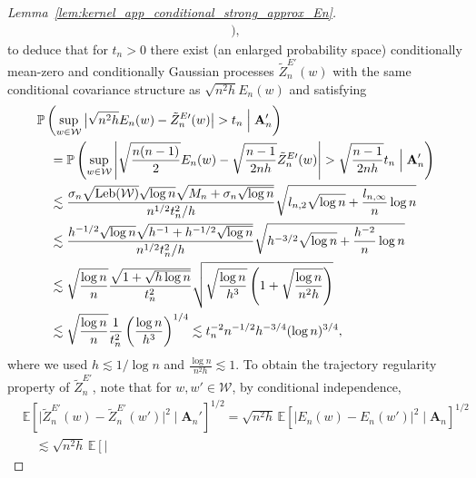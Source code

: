 \documentclass[11pt,lof]{puthesis}
\renewcommand{\P}{\ensuremath{\mathbb{P}}}
\newcommand{\E}{\ensuremath{\mathbb{E}}}
\newcommand{\bA}{\ensuremath{\mathbf{A}}}
\newcommand{\cW}{\ensuremath{\mathcal{W}}}
\DeclareMathOperator{\Leb}{Leb}
\theoremstyle{break}
\theoremstyle{proof}
\newtheorem{proof}{Proof}
\begin{document}
\begin{proof}[Lemma~\ref{lem:kernel_app_conditional_strong_approx_En}]
\begin{align*}
    \Big),
  \end{align*}
  to deduce that for $t_n > 0$ there exist
  (an enlarged probability space)
  conditionally mean-zero
  and conditionally Gaussian processes
  $\tilde Z_n^{E\prime}(w)$
  with the same conditional covariance structure as
  $\sqrt{n^2 h} E_n(w)$ and
  satisfying
  \begin{align*}
    &\P\left(
      \sup_{w \in \cW}
      \big|
      \sqrt{n^2h} E_n(w) - \tilde Z_n^{E\prime}(w)
      \big|
      > t_n
      \Bigm\vert \bA_n'
    \right) \\
    &\quad=
    \P\left(
      \sup_{w \in \cW}
      \left|
        \sqrt{\frac{n(n-1)}{2}} E_n(w)
        - \sqrt{\frac{n-1}{2 n h}} \tilde Z_n^{E\prime}(w)
      \right|
      > \sqrt{\frac{n-1}{2 n h}}
      t_n
      \Bigm\vert \bA_n'
    \right) \\
    &\quad\lesssim
    \frac{
      \sigma_n
      \sqrt{\Leb(\cW)}
      \sqrt{\log n}
      \sqrt{M_n + \sigma_n\sqrt{\log n}}
    }{n^{1/2} t_n^2 / h}
    \sqrt{
      l_{n,2}
      \sqrt{\log n}
      + \frac{l_{n,\infty}}{n}
    \log n} \\
    &\quad\lesssim
    \frac{
      h^{-1/2}
      \sqrt{\log n}
      \sqrt{h^{-1} + h^{-1/2} \sqrt{\log n}}
    }{n^{1/2} t_n^2 / h}
    \sqrt{
      h^{-3/2}
      \sqrt{\log n}
      + \frac{h^{-2}}{n}
    \log n} \\
    &\quad\lesssim
    \sqrt{\frac{\log n}{n}}
    \frac{
      \sqrt{1 + \sqrt{h \log n}}
    }{t_n^2}
    \sqrt{
      \sqrt{\frac{\log n}{h^3}}
      \left( 1 + \sqrt{\frac{\log n}{n^2 h}} \right)
    } \\
    &\quad\lesssim
    \sqrt{\frac{\log n}{n}}
    \frac{ 1 }{t_n^2}
    \left(
      \frac{\log n}{h^3}
    \right)^{1/4}
    \lesssim
    t_n^{-2}
    n^{-1/2}
    h^{-3/4}
    (\log n)^{3/4},
  \end{align*}
  where we used
  $h \lesssim 1 / \log n$
  and $\frac{\log n}{n^2 h} \lesssim 1$.
  To obtain the trajectory regularity property of
  $\tilde Z_n^{E\prime}$,
  note that
  for $w, w' \in \cW$,
  by conditional independence,
  \begin{align*}
    &\E\left[
      \big|
      \tilde Z_n^{E\prime}(w)
      - \tilde Z_n^{E\prime}(w')
      \big|^2
      \mid \bA_n'
    \right]^{1/2}
    =
    \sqrt{n^2h} \,
    \E\left[
      \big|
      E_n(w)
      - E_n(w')
      \big|^2
      \mid \bA_n
    \right]^{1/2} \\
    &\quad\lesssim
    \sqrt{n^2h} \,
    \E\left[
      \left|

\end{align*}
\end{proof}
\end{document}

